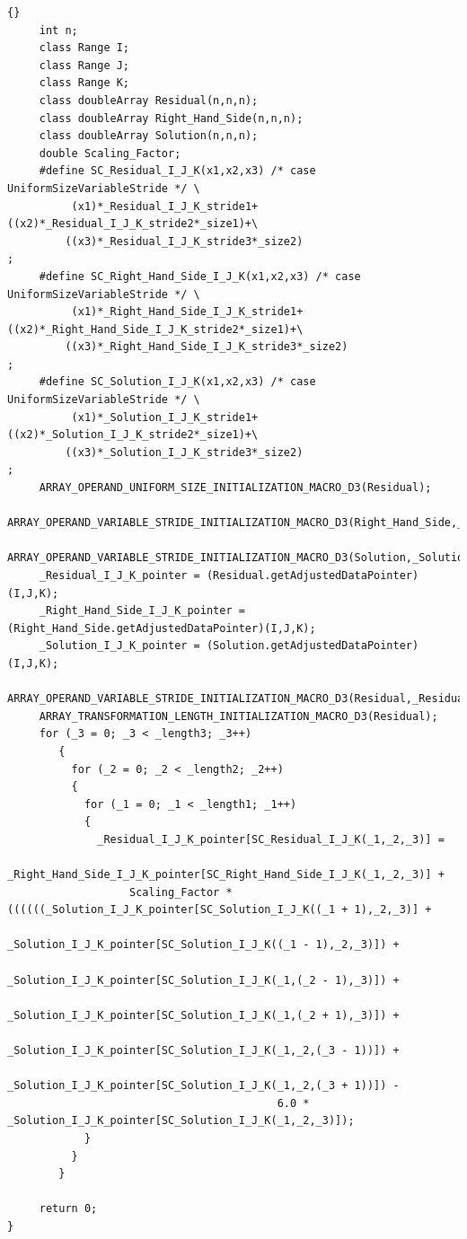 \documentclass[10pt]{article}
\begin{document}
\begin{lstlisting}{}
     int n;
     class Range I;
     class Range J;
     class Range K;
     class doubleArray Residual(n,n,n);
     class doubleArray Right_Hand_Side(n,n,n);
     class doubleArray Solution(n,n,n);
     double Scaling_Factor; 
     #define SC_Residual_I_J_K(x1,x2,x3) /* case UniformSizeVariableStride */ \
          (x1)*_Residual_I_J_K_stride1+((x2)*_Residual_I_J_K_stride2*_size1)+\
         ((x3)*_Residual_I_J_K_stride3*_size2)
;
     #define SC_Right_Hand_Side_I_J_K(x1,x2,x3) /* case UniformSizeVariableStride */ \
          (x1)*_Right_Hand_Side_I_J_K_stride1+((x2)*_Right_Hand_Side_I_J_K_stride2*_size1)+\
         ((x3)*_Right_Hand_Side_I_J_K_stride3*_size2)
;
     #define SC_Solution_I_J_K(x1,x2,x3) /* case UniformSizeVariableStride */ \
          (x1)*_Solution_I_J_K_stride1+((x2)*_Solution_I_J_K_stride2*_size1)+\
         ((x3)*_Solution_I_J_K_stride3*_size2)
; 
     ARRAY_OPERAND_UNIFORM_SIZE_INITIALIZATION_MACRO_D3(Residual); 
     ARRAY_OPERAND_VARIABLE_STRIDE_INITIALIZATION_MACRO_D3(Right_Hand_Side,_Right_Hand_Side_I_J_K); 
     ARRAY_OPERAND_VARIABLE_STRIDE_INITIALIZATION_MACRO_D3(Solution,_Solution_I_J_K); 
     _Residual_I_J_K_pointer = (Residual.getAdjustedDataPointer)(I,J,K); 
     _Right_Hand_Side_I_J_K_pointer = (Right_Hand_Side.getAdjustedDataPointer)(I,J,K); 
     _Solution_I_J_K_pointer = (Solution.getAdjustedDataPointer)(I,J,K); 
     ARRAY_OPERAND_VARIABLE_STRIDE_INITIALIZATION_MACRO_D3(Residual,_Residual_I_J_K); 
     ARRAY_TRANSFORMATION_LENGTH_INITIALIZATION_MACRO_D3(Residual); 
     for (_3 = 0; _3 < _length3; _3++)
        { 
          for (_2 = 0; _2 < _length2; _2++)
          { 
            for (_1 = 0; _1 < _length1; _1++)
            { 
              _Residual_I_J_K_pointer[SC_Residual_I_J_K(_1,_2,_3)] =
                   _Right_Hand_Side_I_J_K_pointer[SC_Right_Hand_Side_I_J_K(_1,_2,_3)] + 
                   Scaling_Factor * ((((((_Solution_I_J_K_pointer[SC_Solution_I_J_K((_1 + 1),_2,_3)] + 
                                          _Solution_I_J_K_pointer[SC_Solution_I_J_K((_1 - 1),_2,_3)]) +
                                          _Solution_I_J_K_pointer[SC_Solution_I_J_K(_1,(_2 - 1),_3)]) +
                                          _Solution_I_J_K_pointer[SC_Solution_I_J_K(_1,(_2 + 1),_3)]) + 
                                          _Solution_I_J_K_pointer[SC_Solution_I_J_K(_1,_2,(_3 - 1))]) +
                                          _Solution_I_J_K_pointer[SC_Solution_I_J_K(_1,_2,(_3 + 1))]) -
                                          6.0 * _Solution_I_J_K_pointer[SC_Solution_I_J_K(_1,_2,_3)]);
            } 
          } 
        } 

     return 0;
} 

\end{lstlisting}
\end{document}
